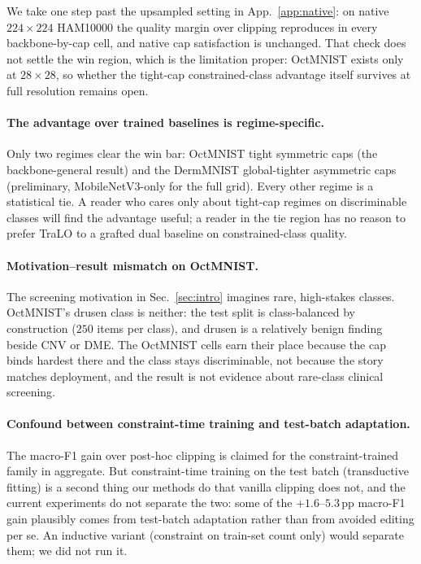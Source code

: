 \documentclass[10pt]{article}
\begin{document}
{We take one step past the upsampled setting in App.~\ref{app:native}:
on native $224{\times}224$ HAM10000 the quality margin over clipping reproduces in
every backbone-by-cap cell, and native cap satisfaction is unchanged. That check
does not settle the win region, which is the limitation proper: OctMNIST exists
only at $28{\times}28$, so whether the tight-cap constrained-class advantage itself
survives at full resolution remains open.}

\paragraph{The advantage over trained baselines is regime-specific.}
Only two regimes clear the win bar: OctMNIST tight symmetric caps (the
backbone-general result) and the DermMNIST global-tighter asymmetric caps
(preliminary, MobileNetV3-only for the full grid). Every other regime is
a statistical tie. A reader who cares only about tight-cap regimes on
discriminable classes will find the advantage useful; a reader in the
tie region has no reason to prefer TraLO to a grafted dual baseline on
constrained-class quality.

\paragraph{Motivation--result mismatch on OctMNIST.}
The screening motivation in Sec.~\ref{sec:intro} imagines rare, high-stakes
classes. OctMNIST's drusen class is neither: the test split is
class-balanced by construction ($250$ items per class), and drusen is a
relatively benign finding beside CNV or DME. The OctMNIST cells earn their
place because the cap binds hardest there and the class stays discriminable,
not because the story matches deployment, and the result is not evidence about
rare-class clinical screening.

\paragraph{Confound between constraint-time training and test-batch
adaptation.} The macro-F1 gain over post-hoc clipping is claimed for the
constraint-trained family in aggregate. But constraint-time training on
the test batch (transductive fitting) is a second thing our methods do
that vanilla clipping does not, and the current experiments do not
separate the two: some of the +$1.6$--$5.3$\,pp macro-F1 gain plausibly
comes from test-batch adaptation rather than from avoided editing per
se. An inductive variant (constraint on train-set count only) would
separate them; we did not run it.
\end{document}
